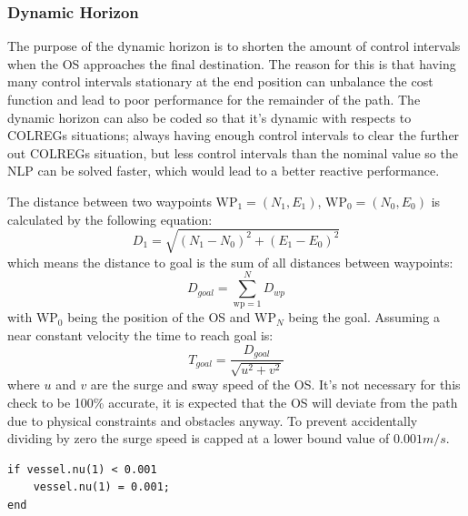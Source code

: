 \subsubsection*{Dynamic Horizon}
The purpose of the dynamic horizon is to shorten the amount of control intervals when the \gls{OS} approaches the final destination. The reason for this
is that having many control intervals stationary at the end position can unbalance the cost function and lead to poor performance for the remainder of the path.
The dynamic horizon can also be coded so that it's dynamic with respects to COLREGs situations; always having enough control intervals to clear the further out
COLREGs situation, but less control intervals than the nominal value so the \gls{NLP} can be solved faster, which would lead to a better reactive performance.

The distance between two waypoints $\textrm{WP}_1 = (N_1, E_1)$,  $\textrm{WP}_0 = (N_0, E_0)$  is calculated by the following equation:
\begin{equation} \label{EQ: Distancebetweenpoints}
    D_{1} = \sqrt{(N_1 - N_0)^2 + (E_1 - E_0)^2}
\end{equation}
which means the distance to goal is the sum of all distances between waypoints:
\begin{equation}
    D_{goal} = \sum_{\textrm{wp} = 1}^{N} D_{wp}
\end{equation}
with $\textrm{WP}_0$ being the position of the \gls{OS} and $\textrm{WP}_N$ being the goal. Assuming a near constant velocity the time to
reach goal is:
\begin{equation}
    T_{goal} = \frac{D_{goal}}{\sqrt{u^2 + v^2}}
\end{equation}
where $u$ and $v$ are the surge and sway speed of the \gls{OS}. It's not necessary for this check to be 100\% accurate, it is expected that the \gls{OS} will deviate from the
path due to physical constraints and obstacles anyway. To prevent accidentally dividing by zero the surge speed is capped at a lower bound value of $0.001m/s$.
\begin{lstlisting}
if vessel.nu(1) < 0.001
    vessel.nu(1) = 0.001;
end
\end{lstlisting}

